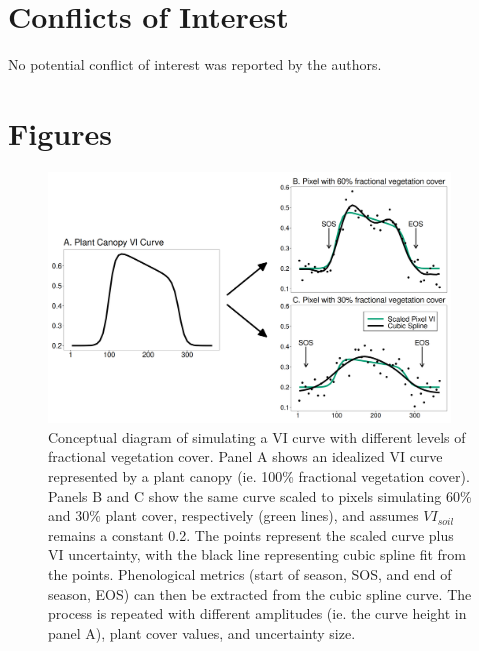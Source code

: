 \documentclass{article}
\begin{document}
\section*{Conflicts of Interest}
No potential conflict of interest was reported by the authors.

\printbibliography

\section*{Figures}


\begin{figure}[h]
    \centering
    \includegraphics[width=0.95\textwidth]{figures/fig1_conceptual_vi_curve.png}
    \caption{Conceptual diagram of simulating a VI curve with different levels of fractional vegetation cover. Panel A shows an idealized VI curve represented by a plant canopy (ie. 100\% fractional vegetation cover). Panels B and C show the same curve scaled to pixels simulating 60\% and 30\% plant cover, respectively (green lines), and assumes $VI_{soil}$ remains a constant 0.2. The points represent the scaled curve plus VI uncertainty, with the black line representing cubic spline fit from the points. Phenological metrics (start of season, SOS, and end of season, EOS) can then be extracted from the cubic spline curve. The process is repeated with different amplitudes (ie. the curve height in panel A), plant cover values, and uncertainty size.}
    \label{fig1}
\end{figure}
\end{document}
